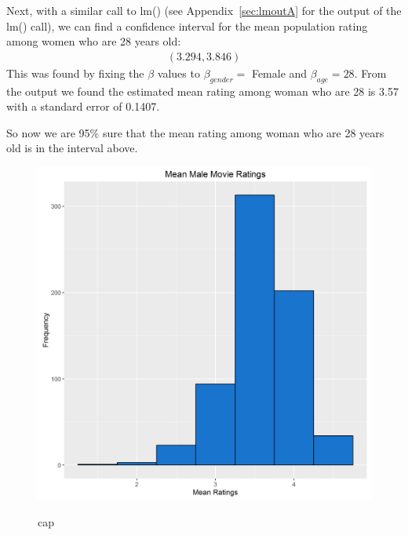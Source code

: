 \documentclass[11pt]{article}  %
\begin{document}
\begin{enumerate}
    Next, with a similar call to lm() (see Appendix~\ref{sec:lmoutA} for the output of the lm() call), we can find a confidence interval for the mean population rating among women who are 28 years old:
    \begin{align*}
        (3.294, 3.846)
    \end{align*}
    This was found by fixing the $\beta$ values to $\beta_{gender} =$ Female and $\beta_{age} = 28$. From the output we found the estimated mean rating among woman who are 28 is 3.57 with a standard error of 0.1407.

    So now we are 95\% sure that the mean rating among woman who are 28 years old is in the interval above.

    \begin{figure}[p]
    \centering
    \caption{cap}
    \includegraphics[scale=.50]{MaleHistogram}
    \label{fig:menhist}
    \end{figure}
    

\end{enumerate}
\end{document}
